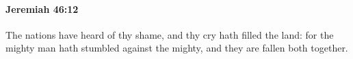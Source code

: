 
		\paragraph{Jeremiah 46:12} %
			\label{JEREMIAH-46-12}

			The nations have heard of thy shame, and thy cry hath filled the land: for the mighty man hath stumbled against the mighty, and they are fallen both together.


